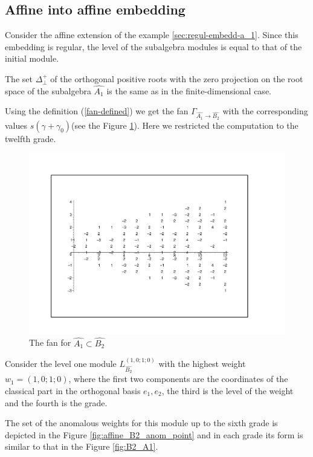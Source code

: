 \documentclass[a4paper,12pt]{article}
\theoremstyle{definition} \newtheorem{Def}{Definition}
\begin{document}
\subsection{Affine into affine embedding}
\label{sec:embedd-affine-algebr}

Consider the affine extension of the example \ref{sec:regul-embedd-a_1}.
Since this embedding is regular, the level of the  subalgebra modules is equal to that of the initial module.

The set $\Delta^{+}_{\bot}$ of the orthogonal positive roots with the zero projection on the root space of the subalgebra $\hat{A_1}$ is the same as in the finite-dimensional case.

Using the definition (\ref{fan-defined}) we get the fan $\Gamma_{\hat{A_1} \longrightarrow  \hat{B_2} }$ with the corresponding values $s(\gamma+\gamma_0)$(see the Figure \ref{fig:AffineB2A1Fan}).
Here we restricted the computation to the twelfth grade.
\begin{figure}[h!tb]
  \centering
  \includegraphics[width=130mm]{AffineB2_A1_fan.pdf}
  \caption{The fan for $\hat{A_1}\subset \hat{B_2}$}
  \label{fig:AffineB2A1Fan}
\end{figure}


Consider the level one module $L^{\left( 1,0;1;0 \right)}_{\hat{B_2}}$  with the highest weight $w_1=(1,0;1;0)$, where the first two components are the coordinates of the classical part in the orthogonal basis $e_1,e_2$, the third is the level of the weight and the fourth is the grade.

The set of the anomalous weights for this module up to the sixth grade is depicted in the Figure \ref{fig:affine_B2_anom_point} and in each grade its form is similar to that in the  Figure \ref{fig:B2_A1}.
\end{document}
